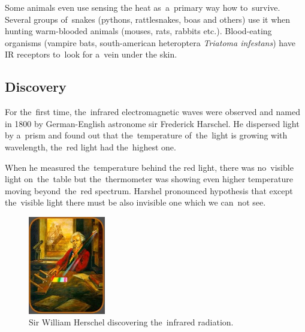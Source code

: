 Some animals even use sensing the heat as~a~primary way how to~survive. Several groups of~snakes
(pythons, rattlesnakes, boas and others) use it when hunting warm-blooded animals (mouses, rats, rabbits etc.).
Blood-eating organisms (vampire bats, south-american heteroptera {\it Triatoma infestans})
have IR receptors to~look for a~vein under the skin.\cite{SnakeInfrared}



\subsection*{Discovery}
For the~first time, the~infrared electromagnetic waves were observed and named in 1800 by German-English
astronome sir Frederick Harschel. He dispersed light by a~prism and found out that the~temperature
of~the~light is growing with wavelength, the~red light had the~highest one.

When he measured the~temperature behind the red light, there was no~visible light on~the~table but
the~thermometer was showing even higher temperature moving beyond~the~red spectrum. Harshel
pronounced hypothesis that except the~visible light there must be also invisible one which we can~not
see. \cite{HerschelLife}

\begin{figure}[h!]
\begin{center}
\includegraphics[width=0.3\textwidth]{obrazky-figures/herschel.jpg}
\caption{Sir William Herschel discovering the~infrared radiation.\cite{HerschelLife}\label{fig:herschel}}
\end{center}    
\end{figure}

